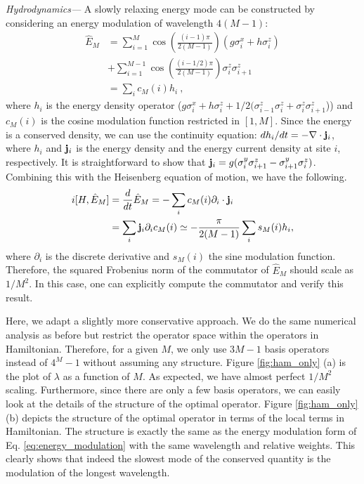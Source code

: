\documentclass[twocolumn,superscriptaddress, prb]{revtex4-1}
\begin{document}
{\it Hydrodynamics---}
A slowly relaxing energy mode can be constructed by considering an energy modulation of wavelength $4(M-1)$:
\begin{align}
\hat{E}_M &= \sum_{i=1}^{M} \cos\left(\frac{(i-1)\pi}{2(M-1)}\right)(g \sigma^x_i + h\sigma^z_i)\nonumber\\
&+ \sum_{i=1}^{M-1} \cos\left(\frac{(i-1/2)\pi}{2(M-1)}\right)\sigma^z_i\sigma^z_{i+1}\\
&= \sum_i c_M(i) h_i ~,
\label{eq:energy_modulation}
\end{align}
where $h_i$ is the energy density operator ($g \sigma^x_i + h\sigma^z_i + 1/2(\sigma^z_{i-1}\sigma^z_i + \sigma^z_i\sigma^z_{i+1}$))
and $c_M(i)$ is the cosine modulation function restricted in $[1,M]$.
Since the energy is a conserved density, we can use the continuity equation:
$d h_i/dt = -\nabla \cdot {\bf j}_i$, where $h_i$ and ${\bf j}_i$ is the energy density and the energy current density at site $i$, respectively.
It is straightforward to show that ${\bf j}_i = g(\sigma^y_i \sigma^z_{i+1} - \sigma^y_{i+1} \sigma^z_i)$.
Combining this with the Heisenberg equation of motion, we have the following.
\begin{align}
 i[H,\hat{E}_M] &= \frac{d}{dt} \hat{E}_M = -\sum_i c_M(i) \partial_i \cdot {\bf j}_i \\
 &= \sum_i {\bf j}_i \partial_i c_M(i) \simeq -\frac{\pi}{2(M-1)} \sum_i s_M(i) h_i,
\end{align}
where $\partial_i$ is the discrete derivative and $s_M(i)$ the sine modulation function.
Therefore, the squared Frobenius norm of the commutator of $\hat{E}_M$ should scale as $1/M^2$.  In this case, one can explicitly compute the commutator and verify this result.

Here, we adapt a slightly more conservative approach.
We do the same numerical analysis as before but restrict the operator space within the operators in Hamiltonian.
Therefore, for a given $M$, we only use $3M - 1$ basis operators instead of $4^M-1$ without assuming any structure.
Figure \ref{fig:ham_only} (a) is the plot of $\lambda$ as a function of $M$.
As expected, we have almost perfect $1/M^2$ scaling.
Furthermore, since there are only a few basis operators, we can easily look at the details of the structure of the optimal operator.
Figure \ref{fig:ham_only} (b) depicts the structure of the optimal operator in terms of the local terms in Hamiltonian.
The structure is exactly the same as the energy modulation form of Eq. \eqref{eq:energy_modulation} with the same wavelength and relative weights.
This clearly shows that indeed the slowest mode of the conserved quantity is the modulation of the longest wavelength.
\end{document}

